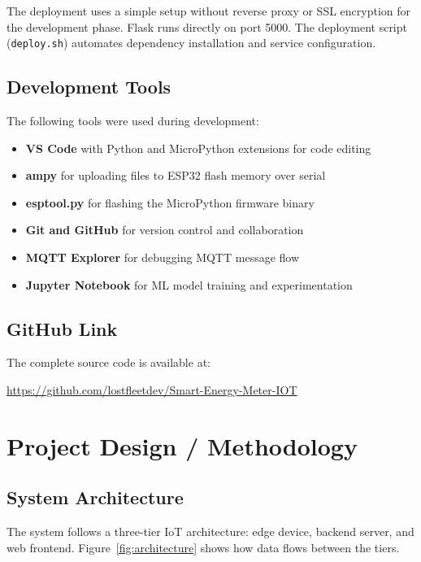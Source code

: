 \documentclass[12pt, a4paper]{article}
\begin{document}
	The deployment uses a simple setup without reverse proxy or SSL encryption for the development phase. Flask runs directly on port 5000. The deployment script (\texttt{deploy.sh}) automates dependency installation and service configuration.
	
	\subsection{Development Tools}
	
	The following tools were used during development:
	
	\begin{itemize}[itemsep=2pt, topsep=6pt]
		\item \textbf{VS Code} with Python and MicroPython extensions for code editing
		\item \textbf{ampy} for uploading files to ESP32 flash memory over serial
		\item \textbf{esptool.py} for flashing the MicroPython firmware binary
		\item \textbf{Git and GitHub} for version control and collaboration
		\item \textbf{MQTT Explorer} for debugging MQTT message flow
		\item \textbf{Jupyter Notebook} for ML model training and experimentation
	\end{itemize}
	
	\subsection{GitHub Link}
	
	The complete source code is available at:
	
	\url{https://github.com/lostfleetdev/Smart-Energy-Meter-IOT}
	
	\newpage
	
	\section{Project Design / Methodology}
	
	\subsection{System Architecture}
	
	The system follows a three-tier IoT architecture: edge device, backend server, and web frontend. Figure~\ref{fig:architecture} shows how data flows between the tiers.
	
\end{document}
